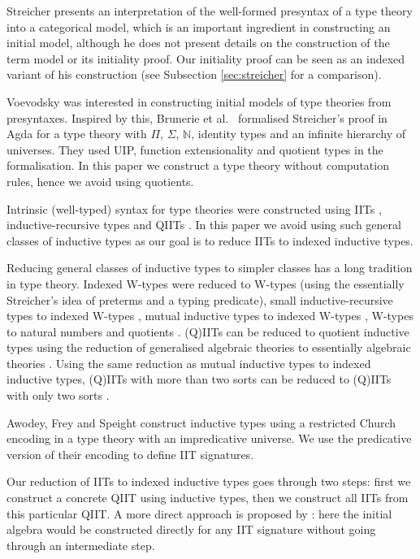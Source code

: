 \documentclass[a4paper,UKenglish,cleveref, autoref]{lipics-v2019}
\begin{document}
Streicher \cite{streichersemantics} presents an interpretation of the well-formed
presyntax of a type theory into a categorical model, which is an important
ingredient in constructing an initial model, although he does not present
details on the construction of the term model or its initiality proof. Our
initiality proof can be seen as an indexed variant of his construction
(see Subsection \ref{sec:streicher} for a comparison).

Voevodsky was interested in constructing initial models of type
theories from presyntaxes. Inspired by this, Brunerie et al.\ \cite{brunerie}
formalised Streicher's proof in Agda for a type theory with $\Pi$,
$\Sigma$, $\mathbb{N}$, identity types and an infinite hierarchy of
universes. They used UIP, function extensionality and quotient types in
the formalisation. In this paper we construct a type theory without
computation rules, hence we avoid using quotients.

Intrinsic (well-typed) syntax for type theories were constructed using
IITs \cite{chapman09eatitself}, inductive-recursive types
\cite{nisse,Altenkirch:2014:CO:2631172.2631176} and QIITs
\cite{ttintt}. In this paper we avoid using such general classes of
inductive types as our goal is to reduce IITs to indexed inductive
types.

Reducing general classes of inductive types to simpler classes has a
long tradition in type theory. Indexed W-types were reduced to W-types
\cite{indexedcont} (using the essentially Streicher's idea of preterms
and a typing predicate), small inductive-recursive types to indexed
W-types \cite{malatasta13smallir}, mutual inductive types to indexed
W-types \cite{mutual}, W-types to natural numbers and quotients
\cite{Ahrens2019}. (Q)IITs can be reduced to quotient inductive types
using the reduction of generalised algebraic theories to essentially
algebraic theories \cite{gat}. Using the same reduction as mutual
inductive types to indexed inductive types, (Q)IITs with more than two
sorts can be reduced to (Q)IITs with only two sorts \cite{szumiemail}.

Awodey, Frey and Speight \cite{DBLP:conf/lics/AwodeyFS18} construct
inductive types using a restricted Church encoding in a type theory
with an impredicative universe. We use the predicative version of
their encoding to define IIT signatures.

Our reduction of IITs to indexed inductive types goes through two
steps: first we construct a concrete QIIT using inductive types, then
we construct all IITs from this particular QIIT. A more direct
approach is proposed by \cite{erasure}: here the initial algebra would
be constructed directly for any IIT signature without going through an
intermediate step.
\end{document}
